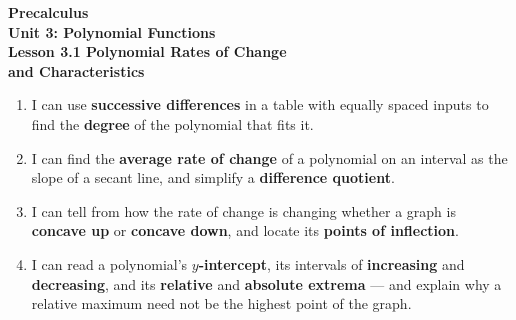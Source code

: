 \documentclass[10pt]{article}
\begin{document}
\vspace{-0.8in}

\begin{center}
  {\color{white}\textbf{\LARGE Precalculus}}\\[4pt]
  {\color{lilacmid}\large\textbf{Unit 3: Polynomial Functions}}\\[6pt]
  {\color{white}\textbf{\large Lesson 3.1 \quad Polynomial Rates of Change}}\\[2pt]
  {\color{white}\textbf{\large and Characteristics}}
\end{center}

\vspace{0.22in}
\namedateperiod
\vspace{0.18in}

\begin{learningtargetbox}
\small
\begin{enumerate}[leftmargin=1.5em, itemsep=5pt]
  \item I can use \textbf{successive differences} in a table with equally spaced inputs to find
        the \textbf{degree} of the polynomial that fits it.
  \item I can find the \textbf{average rate of change} of a polynomial on an interval as the
        slope of a secant line, and simplify a \textbf{difference quotient}.
  \item I can tell from how the rate of change is changing whether a graph is \textbf{concave
        up} or \textbf{concave down}, and locate its \textbf{points of inflection}.
  \item I can read a polynomial's \textbf{$y$-intercept}, its intervals of \textbf{increasing}
        and \textbf{decreasing}, and its \textbf{relative} and \textbf{absolute extrema} --- and
        explain why a relative maximum need not be the highest point of the graph.
\end{enumerate}
\end{learningtargetbox}

\vspace{0.14in}
\end{document}
